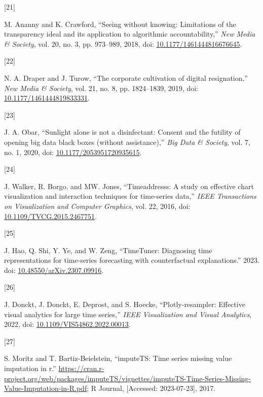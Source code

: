 \documentclass{article}
\newlength{\cslhangindent}
\newlength{\csllabelwidth}
\newlength{\cslentryspacingunit} %
\newenvironment{CSLReferences}[2] %
 {%
  \setlength{\parindent}{0pt}
  \ifodd #1
  \let\oldpar\par
  \def\par{\hangindent=\cslhangindent\oldpar}
  \fi
  \setlength{\parskip}{#2\cslentryspacingunit}
 }%
 {}
\newcommand{\CSLLeftMargin}[1]{\parbox[t]{\csllabelwidth}{#1}}
\newcommand{\CSLRightInline}[1]{\parbox[t]{\linewidth - \csllabelwidth}{#1}\break}
\begin{document}
\begin{CSLReferences}{0}{0}
\leavevmode{}%
\CSLLeftMargin{{[}21{]} }
\CSLRightInline{M. Ananny and K. Crawford, {``Seeing without knowing:
Limitations of the transparency ideal and its application to algorithmic
accountability,''} \emph{New Media \& Society}, vol. 20, no. 3, pp.
973--989, 2018, doi:
\href{https://doi.org/10.1177/1461444816676645}{10.1177/1461444816676645}.}

\leavevmode{}%
\CSLLeftMargin{{[}22{]} }
\CSLRightInline{N. A. Draper and J. Turow, {``The corporate cultivation
of digital resignation,''} \emph{New Media \& Society}, vol. 21, no. 8,
pp. 1824--1839, 2019, doi:
\href{https://doi.org/10.1177/1461444819833331}{10.1177/1461444819833331}.}

\leavevmode{}%
\CSLLeftMargin{{[}23{]} }
\CSLRightInline{J. A. Obar, {``Sunlight alone is not a disinfectant:
Consent and the futility of opening big data black boxes (without
assistance),''} \emph{Big Data \& Society}, vol. 7, no. 1, 2020, doi:
\href{https://doi.org/10.1177/2053951720935615}{10.1177/2053951720935615}.}

\leavevmode{}%
\CSLLeftMargin{{[}24{]} }
\CSLRightInline{J. Walker, R. Borgo, and MW. Jones, {``Timeaddresss: A
study on effective chart visualization and interaction techniques for
time-series data,''} \emph{IEEE Transactions on Visualization and
Computer Graphics}, vol. 22, 2016, doi:
\href{https://doi.org/10.1109/TVCG.2015.2467751}{10.1109/TVCG.2015.2467751}.}

\leavevmode{}%
\CSLLeftMargin{{[}25{]} }
\CSLRightInline{J. Hao, Q. Shi, Y. Ye, and W. Zeng, {``TimeTuner:
Diagnosing time representations for time-series forecasting with
counterfactual explanations.''} 2023. doi:
\href{https://doi.org/10.48550/arXiv.2307.09916}{10.48550/arXiv.2307.09916}.}

\leavevmode{}%
\CSLLeftMargin{{[}26{]} }
\CSLRightInline{J. Donckt, J. Donckt, E. Deprost, and S. Hoecke,
{``Plotly-resampler: Effective visual analytics for large time
series,''} \emph{IEEE Visualization and Visual Analytics}, 2022, doi:
\href{https://doi.org/10.1109/VIS54862.2022.00013}{10.1109/VIS54862.2022.00013}.}

\leavevmode{}%
\CSLLeftMargin{{[}27{]} }
\CSLRightInline{S. Moritz and T. Bartiz-Beielstein, {``imputeTS: Time
series missing value imputation in r.''}
\url{https://cran.r-project.org/web/packages/imputeTS/vignettes/imputeTS-Time-Series-Missing-Value-Imputation-in-R.pdf};
R Journal, {[}Accessed: 2023-07-23{]}, 2017.}


\end{CSLReferences}
\end{document}
